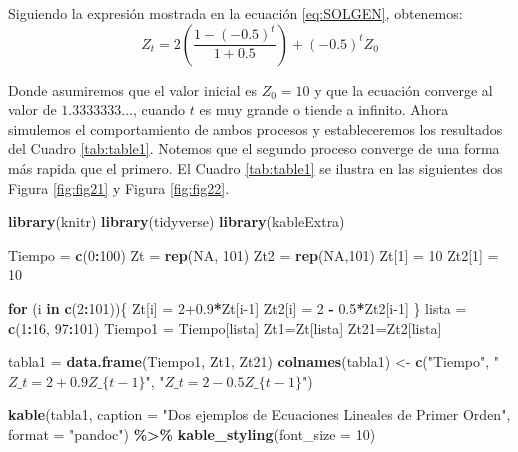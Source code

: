 \documentclass[
]{book}
\newenvironment{Shaded}{\begin{snugshade}}{\end{snugshade}}
\newcommand{\AttributeTok}[1]{\textcolor[rgb]{0.13,0.29,0.53}{#1}}
\newcommand{\ConstantTok}[1]{\textcolor[rgb]{0.56,0.35,0.01}{#1}}
\newcommand{\ControlFlowTok}[1]{\textcolor[rgb]{0.13,0.29,0.53}{\textbf{#1}}}
\newcommand{\DecValTok}[1]{\textcolor[rgb]{0.00,0.00,0.81}{#1}}
\newcommand{\FloatTok}[1]{\textcolor[rgb]{0.00,0.00,0.81}{#1}}
\newcommand{\FunctionTok}[1]{\textcolor[rgb]{0.13,0.29,0.53}{\textbf{#1}}}
\newcommand{\NormalTok}[1]{#1}
\newcommand{\OtherTok}[1]{\textcolor[rgb]{0.56,0.35,0.01}{#1}}
\newcommand{\SpecialCharTok}[1]{\textcolor[rgb]{0.81,0.36,0.00}{\textbf{#1}}}
\newcommand{\StringTok}[1]{\textcolor[rgb]{0.31,0.60,0.02}{#1}}
\begin{document}
Siguiendo la expresión mostrada en la ecuación \eqref{eq:SOLGEN}, obtenemos:
\begin{equation}
    Z_t = 2 \left( \frac{1 - (-0.5)^{t}}{1 + 0.5} \right) + (-0.5)^t Z_0
\label{eq:ex4}
\end{equation}

Donde asumiremos que el valor inicial es \(Z_0 = 10\) y que la ecuación converge al valor de \(1.3333333 \ldots\), cuando \(t\) es muy grande o tiende a infinito. Ahora simulemos el comportamiento de ambos procesos y estableceremos los resultados del Cuadro \ref{tab:table1}. Notemos que el segundo proceso converge de una forma más rapida que el primero. El Cuadro \ref{tab:table1} se ilustra en las siguientes dos Figura \ref{fig:fig21} y Figura \ref{fig:fig22}.

\begin{Shaded}
\begin{Highlighting}[]
\FunctionTok{library}\NormalTok{(knitr)}
\FunctionTok{library}\NormalTok{(tidyverse)}
\FunctionTok{library}\NormalTok{(kableExtra)}

\NormalTok{Tiempo }\OtherTok{=} \FunctionTok{c}\NormalTok{(}\DecValTok{0}\SpecialCharTok{:}\DecValTok{100}\NormalTok{)}
\NormalTok{Zt }\OtherTok{=} \FunctionTok{rep}\NormalTok{(}\ConstantTok{NA}\NormalTok{, }\DecValTok{101}\NormalTok{)}
\NormalTok{Zt2 }\OtherTok{=} \FunctionTok{rep}\NormalTok{(}\ConstantTok{NA}\NormalTok{,}\DecValTok{101}\NormalTok{)}
\NormalTok{Zt[}\DecValTok{1}\NormalTok{] }\OtherTok{=} \DecValTok{10}
\NormalTok{Zt2[}\DecValTok{1}\NormalTok{] }\OtherTok{=} \DecValTok{10}

\ControlFlowTok{for}\NormalTok{ (i }\ControlFlowTok{in} \FunctionTok{c}\NormalTok{(}\DecValTok{2}\SpecialCharTok{:}\DecValTok{101}\NormalTok{))\{}
\NormalTok{  Zt[i] }\OtherTok{=} \DecValTok{2}\FloatTok{+0.9}\SpecialCharTok{*}\NormalTok{Zt[i}\DecValTok{{-}1}\NormalTok{]}
\NormalTok{  Zt2[i] }\OtherTok{=} \DecValTok{2} \SpecialCharTok{{-}} \FloatTok{0.5}\SpecialCharTok{*}\NormalTok{Zt2[i}\DecValTok{{-}1}\NormalTok{]}
\NormalTok{\}}
\NormalTok{lista }\OtherTok{=} \FunctionTok{c}\NormalTok{(}\DecValTok{1}\SpecialCharTok{:}\DecValTok{16}\NormalTok{, }\DecValTok{97}\SpecialCharTok{:}\DecValTok{101}\NormalTok{)}
\NormalTok{Tiempo1 }\OtherTok{=}\NormalTok{ Tiempo[lista]}
\NormalTok{Zt1}\OtherTok{=}\NormalTok{Zt[lista]}
\NormalTok{Zt21}\OtherTok{=}\NormalTok{Zt2[lista]}

\NormalTok{tabla1 }\OtherTok{=} \FunctionTok{data.frame}\NormalTok{(Tiempo1, Zt1, Zt21)}
\FunctionTok{colnames}\NormalTok{(tabla1) }\OtherTok{\textless{}{-}} \FunctionTok{c}\NormalTok{(}\StringTok{"Tiempo"}\NormalTok{, }\StringTok{"$Z\_t =2+0.9Z\_\{t{-}1\}$"}\NormalTok{, }
                      \StringTok{"$Z\_t = 2{-}0.5Z\_\{t{-}1\}$"}\NormalTok{)}

\FunctionTok{kable}\NormalTok{(tabla1, }
      \AttributeTok{caption =} \StringTok{"Dos ejemplos de Ecuaciones Lineales de Primer Orden"}\NormalTok{, }
      \AttributeTok{format =} \StringTok{"pandoc"}\NormalTok{) }\SpecialCharTok{\%\textgreater{}\%}
  \FunctionTok{kable\_styling}\NormalTok{(}\AttributeTok{font\_size =} \DecValTok{10}\NormalTok{)}
\end{Highlighting}
\end{Shaded}
\end{document}
